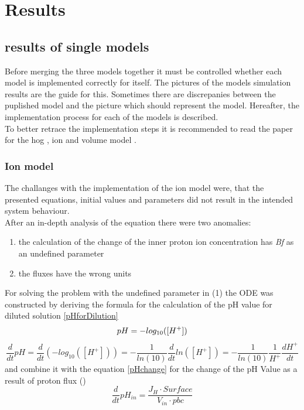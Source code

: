 \section{Results}
\subsection{results of single models}
Before merging the three models together it must be controlled whether each model is implemented correctly for itself. The pictures of the models simulation results are the guide for this. Sometimes there are discrepanies between the puplished model and the picture which should represent the model.  Hereafter, the implementation process for each of the models is described.\\
To better retrace the implementation steps it is recommended to read the paper for the hog \cite{Zi_2010}, ion \cite{Gerber_2016} and volume model  \cite{volumeModel}.

\subsubsection{Ion model}
The challanges with the implementation of the ion model were, that the presented equations, initial values and parameters did not result in the intended system behaviour. \\
After an in-depth analysis of the equation there were two anomalies:

\begin{enumerate}
	\item the calculation of the change of the inner proton ion concentration has \emph{Bf} as an undefined parameter
	\item the fluxes have the wrong units
\end{enumerate}

For solving the problem with the undefined parameter in (1) the ODE was constructed by deriving the formula for the calculation of the pH value for diluted solution \ref{pHforDilution}
\begin{equation*}
	pH = - log_{10}([H^+])\\
\end{equation*}
\begin{equation}\label{pHforDilution}
	\frac{d}{dt}pH = \frac{d}{dt}(-log_{10}([H^+])) = - \frac{1}{ln(10)} \frac{d}{dt}ln([H^+]) = - \frac{1}{ln(10)}\frac{1}{H^+} \frac{dH^+}{dt}
\end{equation}
and combine it with the equation \ref{pHchange} for the change of the pH Value as a result of proton flux (\cite{martinafroehlich})
\begin{equation}\label{pHchange}
	\frac{d}{dt}pH_{in} = \frac{J_H \cdot Surface}{V_{in} \cdot pbc}
\end{equation}
	
